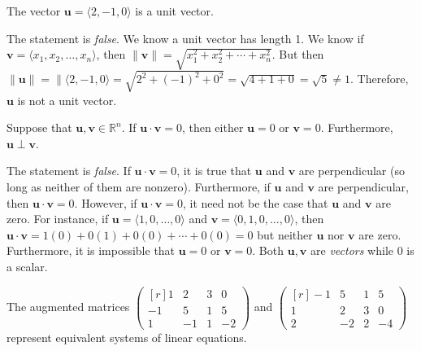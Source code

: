 \documentclass[11pt,letterpaper]{article}
\begin{document}
\thispagestyle{title}

 The vector $\mathbf{u}= \langle 2, -1, 0 \rangle$ is a unit vector. \pspace

\sol The statement is \textit{false}. We know a unit vector has length 1. We know if $\mathbf{v}= \langle x_1, x_2, \ldots, x_n \rangle$, then $\|\mathbf{v}\|= \sqrt{x_1^2 + x_2^2 + \cdots + x_n^2}$. But then $\|\mathbf{u}\|= \| \langle 2, -1, 0 \rangle= \sqrt{2^2 + (-1)^2 + 0^2}= \sqrt{4 + 1 + 0}= \sqrt{5} \neq 1$. Therefore, $\mathbf{u}$ is not a unit vector. \pvspace{1.3cm}



 Suppose that $\mathbf{u}, \mathbf{v} \in \mathbb{R}^n$. If $\mathbf{u} \cdot \mathbf{v}= 0$, then either $\mathbf{u}= 0$ or $\mathbf{v}= 0$. Furthermore, $\mathbf{u} \perp \mathbf{v}$. \pspace

\sol The statement is \textit{false}. If $\mathbf{u} \cdot \mathbf{v}= 0$, it is true that $\mathbf{u}$ and $\mathbf{v}$ are perpendicular (so long as neither of them are nonzero). Furthermore, if $\mathbf{u}$ and $\mathbf{v}$ are perpendicular, then $\mathbf{u} \cdot \mathbf{v}= 0$. However, if $\mathbf{u} \cdot \mathbf{v}= 0$, it need not be the case that $\mathbf{u}$ and $\mathbf{v}$ are zero. For instance, if $\mathbf{u}= \langle 1, 0, \ldots, 0 \rangle$ and $\mathbf{v}= \langle 0, 1, 0, \ldots, 0 \rangle$, then $\mathbf{u} \cdot \mathbf{v}= 1(0) + 0(1) + 0(0) + \cdots + 0(0)= 0$ but neither $\mathbf{u}$ nor $\mathbf{v}$ are zero. Furthermore, it is impossible that $\mathbf{u}= 0$ or $\mathbf{v}= 0$. Both $\mathbf{u}, \mathbf{v}$ are \textit{vectors} while 0 is a scalar. \pvspace{1.3cm}



 The augmented matrices $\begin{pmatrix*}[r] 1 & 2 & 3 & 0 \\ -1 & 5 & 1 & 5 \\ 1 & -1 & 1 & -2 \end{pmatrix*}$ and $\begin{pmatrix*}[r] -1 & 5 & 1 & 5 \\ 1 & 2 & 3 & 0 \\ 2 & -2 & 2 & -4 \end{pmatrix*}$ represent equivalent systems of linear equations. \pspace
\end{document}
